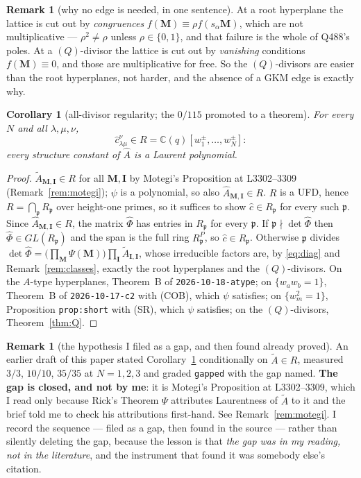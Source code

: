 \documentclass[11pt]{article}
\newtheorem{cor}[thm]{Corollary}
\theoremstyle{definition}
\newtheorem{rem}[thm]{Remark}
\newcommand{\At}{\widetilde{A}}
\newcommand{\Ah}{\widehat{A}}
\newcommand{\bM}{\mathbf{M}}
\newcommand{\bI}{\mathbf{I}}
\begin{document}
\begin{rem}[why no edge is needed, in one sentence]
At a root hyperplane the lattice is cut out by \emph{congruences}
$f(\bM)\equiv\rho f(s_\alpha\bM)$, which are not multiplicative --- $\rho^{2}\ne
\rho$ unless $\rho\in\{0,1\}$, and that failure is the whole of Q488's poles.  At
a $(Q)$-divisor the lattice is cut out by \emph{vanishing} conditions
$f(\bM)\equiv0$, and those are multiplicative for free.  So the $(Q)$-divisors are
easier than the root hyperplanes, not harder, and the absence of a GKM edge is
exactly why.
\end{rem}

\begin{cor}[all-divisor regularity; the $0/115$ promoted to a theorem]\label{cor:laurent}
For every $N$ and all $\lambda,\mu,\nu$,
\[
   \hat c^{\nu}_{\lambda\mu}\in R=\mathbb{C}(q)[w_1^{\pm},\dots,w_N^{\pm}] :
\]
every structure constant of $\Ah$ is a Laurent polynomial.
\end{cor}

\begin{proof}
$\At_{\bM,\bI}\in R$ for all $\bM,\bI$ by Motegi's Proposition at L3302--3309
(Remark~\ref{rem:motegi}); $\psi$ is a polynomial, so also $\Ah_{\bM,\bI}\in R$.
$R$ is a UFD, hence $R=\bigcap_{\mathfrak p}R_{\mathfrak p}$ over height-one
primes, so it suffices to show $\hat c\in R_{\mathfrak p}$ for every such
$\mathfrak p$.  Since $\Ah_{\bM,\bI}\in R$, the matrix
$\widehat\Phi$ has entries in $R_{\mathfrak p}$ for every $\mathfrak p$.  If
$\mathfrak p\nmid\det\widehat\Phi$ then
$\widehat\Phi\in GL(R_{\mathfrak p})$ and the span is the full ring
$R_{\mathfrak p}^{P}$, so $\hat c\in R_{\mathfrak p}$.  Otherwise $\mathfrak p$
divides $\det\widehat\Phi=\bigl(\prod_{\bM}\Psi(\bM)\bigr)\prod_{\bI}
\At_{\bI,\bI}$, whose irreducible factors are, by \eqref{eq:diag} and
Remark~\ref{rem:classes}, exactly the root hyperplanes and the $(Q)$-divisors.
On the $A$-type hyperplanes, Theorem~B of
\texttt{2026-10-18-atype}; on $\{w_aw_b=1\}$, Theorem~B of
\texttt{2026-10-17-c2} with (COB), which $\psi$ satisfies; on $\{w_m^{2}=1\}$,
Proposition \texttt{prop:short} with (SR), which $\psi$ satisfies; on the
$(Q)$-divisors, Theorem~\ref{thm:Q}.
\end{proof}

\begin{rem}[the hypothesis I filed as a gap, and then found already proved]
\label{rem:gapR}
An earlier draft of this paper stated Corollary~\ref{cor:laurent} conditionally on
$\At\in R$, measured $3/3$, $10/10$, $35/35$ at $N=1,2,3$ and graded
\texttt{gapped} with the gap named.  \textbf{The gap is closed, and not by me}:
it is Motegi's Proposition at L3302--3309, which I read only because Rick's
Theorem $\Psi$ attributes Laurentness of $\At$ to it and the brief told me to
check his attributions first-hand.  See Remark~\ref{rem:motegi}.  I record the
sequence --- filed as a gap, then found in the source --- rather than silently
deleting the gap, because the lesson is that \emph{the gap was in my reading, not
in the literature}, and the instrument that found it was somebody else's citation.
\end{rem}
\end{document}
